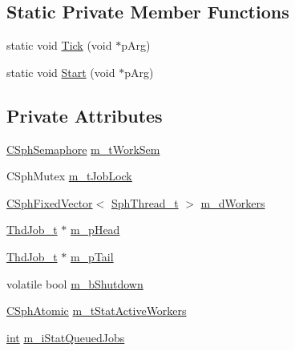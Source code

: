 \subsection*{Static Private Member Functions}
\begin{DoxyCompactItemize}
\item 
static void \hyperlink{classCSphThdPool_aee23057b7b6f01e0ae55a7375dfdfd47}{Tick} (void $\ast$p\-Arg)
\item 
static void \hyperlink{classCSphThdPool_afeaace5759fe6bc4398c80d0ba47ddcf}{Start} (void $\ast$p\-Arg)
\end{DoxyCompactItemize}
\subsection*{Private Attributes}
\begin{DoxyCompactItemize}
\item 
\hyperlink{classCSphSemaphore}{C\-Sph\-Semaphore} \hyperlink{classCSphThdPool_a7c537b90f8b1fe6dfd684656fa030468}{m\-\_\-t\-Work\-Sem}
\item 
C\-Sph\-Mutex \hyperlink{classCSphThdPool_ab4817c7b59ea9af409e2930314958af6}{m\-\_\-t\-Job\-Lock}
\item 
\hyperlink{classCSphFixedVector}{C\-Sph\-Fixed\-Vector}$<$ \hyperlink{sphinxstd_8h_ad728334ec85e8a6b4db5bc1efd06447a}{Sph\-Thread\-\_\-t} $>$ \hyperlink{classCSphThdPool_a9fbfebb75daea5b07050c6ae76f40f06}{m\-\_\-d\-Workers}
\item 
\hyperlink{structThdJob__t}{Thd\-Job\-\_\-t} $\ast$ \hyperlink{classCSphThdPool_a38b3c31b616e2c0392868f9ec92eb10f}{m\-\_\-p\-Head}
\item 
\hyperlink{structThdJob__t}{Thd\-Job\-\_\-t} $\ast$ \hyperlink{classCSphThdPool_aa02c54dedad8e47d3762d27e5855c2e7}{m\-\_\-p\-Tail}
\item 
volatile bool \hyperlink{classCSphThdPool_a2daa42b46c298c5b0f6875ad62f6ade6}{m\-\_\-b\-Shutdown}
\item 
\hyperlink{sphinxstd_8h_a9699401fcfba9f39dfa1838a3af04fe2}{C\-Sph\-Atomic} \hyperlink{classCSphThdPool_a8c6655adc2a0a9d98bcffaf290c55bbc}{m\-\_\-t\-Stat\-Active\-Workers}
\item 
\hyperlink{sphinxexpr_8cpp_a4a26e8f9cb8b736e0c4cbf4d16de985e}{int} \hyperlink{classCSphThdPool_ade216a20f82adfd0b52986c7f24fc822}{m\-\_\-i\-Stat\-Queued\-Jobs}
\end{DoxyCompactItemize}



